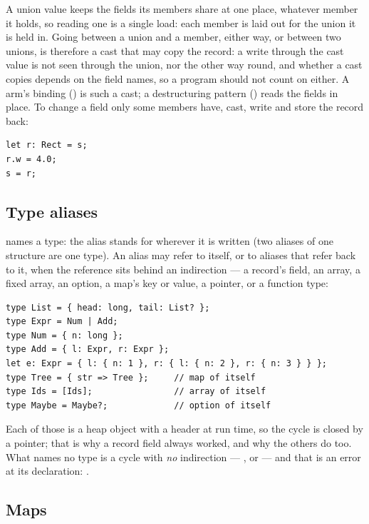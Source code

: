 A union value keeps the fields its members share at one place, whatever
member it holds, so reading one is a single load: each member is laid
out for the union it is held in. Going between a union and a member,
either way, or between two unions, is therefore a cast that may copy the
record: a write through the cast value is not seen through the union,
nor the other way round, and whether a cast copies depends on the field
names, so a program should not count on either. A  arm's
binding () is such a cast; a destructuring pattern
() reads the fields in place. To change a field only
some members have, cast, write and store the record back:

\begin{lstlisting}
let r: Rect = s;
r.w = 4.0;
s = r;
\end{lstlisting}

\subsection{Type aliases}
\label{sec:type-aliases}

 names a type: the alias stands for  wherever
it is written (two aliases of one structure are one type). An alias may
refer to itself, or to aliases that refer back to it, when the reference
sits behind an indirection --- a record's field, an array, a fixed array,
an option, a map's key or value, a pointer, or a function type:

\begin{lstlisting}
type List = { head: long, tail: List? };
type Expr = Num | Add;
type Num = { n: long };
type Add = { l: Expr, r: Expr };
let e: Expr = { l: { n: 1 }, r: { l: { n: 2 }, r: { n: 3 } } };
type Tree = { str => Tree };     // map of itself
type Ids = [Ids];                // array of itself
type Maybe = Maybe?;             // option of itself
\end{lstlisting}

\noindent Each of those is a heap object with a header at run time, so the
cycle is closed by a pointer; that is why a record field always worked, and
why the others do too. What names no type is a cycle with \emph{no}
indirection --- ,  or
 --- and that is an error at its
declaration: 
.

\subsection{Maps}
\label{sec:type-maps}

